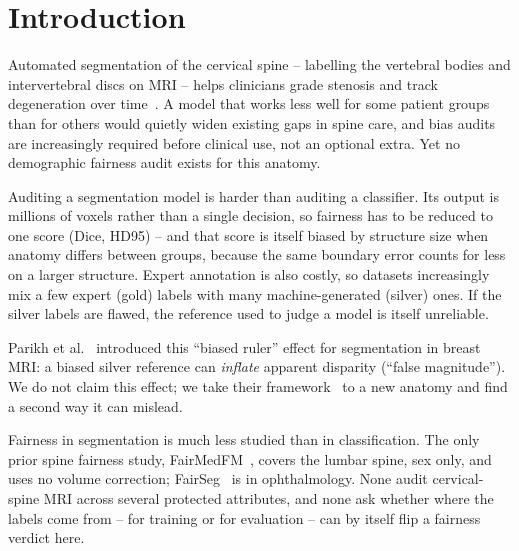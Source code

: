\section{Introduction}

Automated segmentation of the cervical spine -- labelling the vertebral bodies and
intervertebral discs on MRI -- helps clinicians grade stenosis and track degeneration
over time~\cite{kato2012cervical}. A model that works less well for some patient groups
than for others would quietly widen existing gaps in spine care, and bias audits are
increasingly required before clinical use, not an optional extra. Yet no demographic
fairness audit exists for this anatomy.

Auditing a segmentation model is harder than auditing a classifier. Its output is
millions of voxels rather than a single decision, so fairness has to be reduced to one
score (Dice, HD95) -- and that score is itself biased by structure size when anatomy
differs between groups, because the same boundary error counts for less on a larger
structure. Expert annotation is also costly, so datasets increasingly mix a few expert
(gold) labels with many machine-generated (silver) ones. If the silver labels are
flawed, the reference used to judge a model is itself unreliable.

Parikh et al.~\cite{parikh2025labelbias} introduced this ``biased ruler'' effect for
segmentation in breast MRI: a biased silver reference can \emph{inflate} apparent
disparity (``false magnitude''). We do not claim this effect; we take their
framework~\cite{parikh2025labelbias,parikh2025whofails} to a new anatomy and find a
second way it can mislead.

Fairness in segmentation is much less studied than in classification. The only prior
spine fairness study, FairMedFM~\cite{jin2024fairmedfm}, covers the lumbar spine, sex
only, and uses no volume correction; FairSeg~\cite{tian2024fairseg} is in ophthalmology.
None audit cervical-spine MRI across several protected attributes, and none ask whether
where the labels come from -- for training or for evaluation -- can by itself flip a
fairness verdict here.

